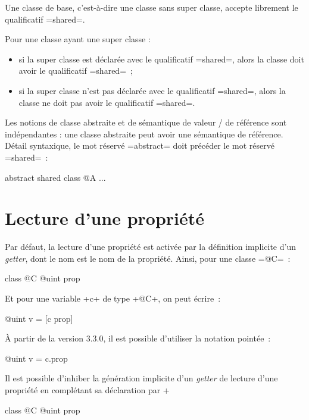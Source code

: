 Une classe de base, c'est-à-dire une classe sans super classe, accepte librement le qualificatif \ggs=shared=.

Pour une classe ayant une super classe :
\begin{itemize}
  \item si la super classe est déclarée avec le qualificatif \ggs=shared=, alors la classe doit avoir le qualificatif \ggs=shared=~;
  \item si la super classe n'est pas déclarée avec le qualificatif \ggs=shared=, alors la classe ne doit pas avoir le qualificatif \ggs=shared=.
\end{itemize}

Les notions de classe abstraite et de sémantique de valeur / de référence sont indépendantes : une classe abstraite peut avoir une sémantique de référence. Détail syntaxique, le mot réservé \ggs=abstract= doit précéder le mot réservé \ggs=shared=~:

abstract shared class @A {
  ...
}








\section{Lecture d'une propriété}

Par défaut, la lecture d'une propriété est activée par la définition implicite d'un \emph{getter}, dont le nom est le nom de la propriété. Ainsi, pour une classe \ggs=@C=~:

\begin{galgas}
class @C {
  @uint prop
}
\end{galgas}

Et pour une variable \ggs+c+ de type \ggs+@C+, on peut écrire~:

\begin{galgas}
@uint v = [c prop]
\end{galgas}

À partir de la version 3.3.0, il est possible d'utiliser la notation pointée~:
\begin{galgas}
@uint v = c.prop
\end{galgas}

Il est possible d'inhiber la génération implicite d'un \emph{getter} de lecture d'une propriété en complétant sa déclaration par \ggs+%

\begin{galgas}
class @C {
  @uint prop %
}
\end{galgas}

